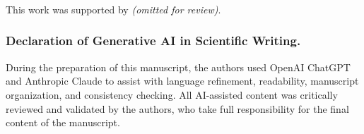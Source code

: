 \documentclass[runningheads]{llncs}
\begin{document}
\begin{credits}
\subsubsection{\ackname}
This work was supported by \textit{(omitted for review)}.
\subsubsection{Declaration of Generative AI in Scientific Writing.}
During the preparation of this manuscript, the authors used OpenAI ChatGPT and Anthropic Claude to assist with language refinement, readability, manuscript organization, and consistency checking. All AI-assisted content was critically reviewed and validated by the authors, who take full responsibility for the final content of the manuscript.
\end{credits}



\end{document}
